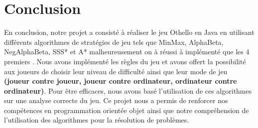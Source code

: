 \documentclass[12pt]{article}
\begin{document}
	
	
	
	
	
	
	
	
	
	
	
	
	
	
	
	
	
	
	
	
	
	
	
	
	
	\section{Conclusion}
En conclusion, notre projet a consisté à réaliser le jeu Othello en Java en utilisant différents algorithmes de stratégies de jeu tels que MinMax, AlphaBeta, NegAlphaBeta, SSS* et A* malheureusement on à réussi à implémenté que les 4 premiers . Nous avons implémenté les règles du jeu et avons offert la possibilité aux joueurs de choisir leur niveau de difficulté ainsi que leur mode de jeu \textbf{(joueur contre joueur, joueur contre ordinateur, ordinateur contre ordinateur)}. Pour être efficaces, nous avons basé l'utilisation de ces algorithmes sur une analyse correcte du jeu. Ce projet nous a permis de renforcer nos compétences en programmation orientée objet ainsi que notre compréhension de l'utilisation des algorithmes pour la résolution de problèmes.
\end{document}
